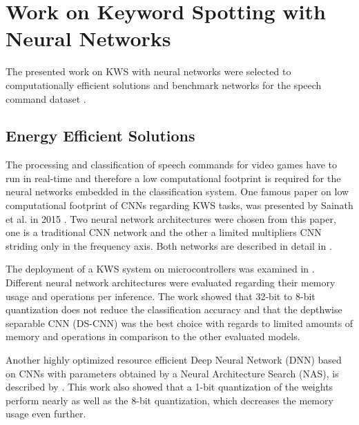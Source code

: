 
\section{Work on Keyword Spotting with Neural Networks}\label{sec:prev_kws}
The presented work on KWS with neural networks were selected to computationally efficient solutions and benchmark networks for the speech command dataset \cite{Warden2018}.



\subsection{Energy Efficient Solutions}
The processing and classification of speech commands for video games have to run in real-time and therefore a low computational footprint is required for the neural networks embedded in the classification system.
One famous paper on low computational footprint of CNNs regarding KWS tasks, was presented by Sainath et al. in 2015 \cite{Sainath2015}.
Two neural network architectures were chosen from this paper, one is a traditional CNN network and the other a limited multipliers CNN striding only in the frequency axis.
Both networks are described in detail in .

The deployment of a KWS system on microcontrollers was examined in \cite{Zhang2017}.
Different neural network architectures were evaluated regarding their memory usage and operations per inference.
The work showed that 32-bit to 8-bit quantization does not reduce the classification accuracy and that the depthwise separable CNN (DS-CNN) was the best choice with regards to limited amounts of memory and operations in comparison to the other evaluated models.

Another highly optimized resource efficient Deep Neural Network (DNN) based on CNNs with parameters obtained by a Neural Architecture Search (NAS), is described by \cite{Peter2020}.
This work also showed that a 1-bit quantization of the weights perform nearly as well as the 8-bit quantization, which decreases the memory usage even further.



